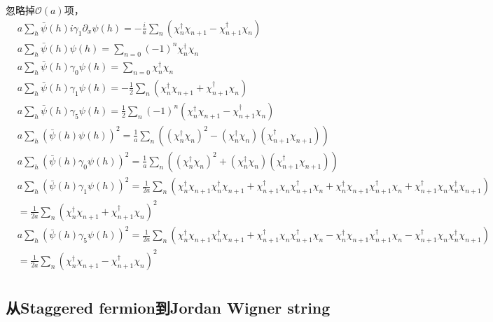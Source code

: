 忽略掉$\mathcal{O}(a)$项，
\begin{equation}
\begin{split}
&a\sum _h \bar{\psi}(h)i\gamma _1\partial _x \psi(h) = -\frac{i}{a} \sum _n \left(\chi^{\dagger}_n\chi _{n+1} - \chi ^{\dagger}_{n+1}\chi _n\right)\\
&a\sum _h \bar{\psi}(h) \psi(h) = \sum _{n=0} (-1)^n \chi^{\dagger} _n\chi _n\\
&a\sum _h \bar{\psi}(h) \gamma _0 \psi(h) =\sum _{n=0} \chi^{\dagger} _n\chi _n\\
&a\sum _h \bar{\psi}(h) \gamma _1 \psi(h) =-\frac{1}{2}\sum _{n}\left(\chi ^{\dagger}_{n}\chi _{n+1}+ \chi ^{\dagger}_{n+1}\chi _{n}\right)\\
&a\sum _h \bar{\psi}(h) \gamma _5 \psi(h) =\frac{1}{2}\sum _{n}(-1)^n\left(\chi ^{\dagger}_{n}\chi _{n+1}- \chi ^{\dagger}_{n+1}\chi _{n}\right)\\
&a\sum _h (\bar{\psi}(h) \psi(h) )^2=\frac{1}{a}\sum _n \left((\chi ^{\dagger}_{n}\chi _{n})^2-(\chi ^{\dagger}_{n}\chi _{n}) (\chi ^{\dagger}_{n+1}\chi _{n+1})\right)\\
&a\sum _h (\bar{\psi}(h) \gamma _0 \psi(h) )^2=\frac{1}{a}\sum _n \left((\chi ^{\dagger}_{n}\chi _{n})^2+(\chi ^{\dagger}_{n}\chi _{n}) (\chi ^{\dagger}_{n+1}\chi _{n+1})\right)\\
&a\sum _h (\bar{\psi}(h) \gamma _1 \psi(h) )^2=\frac{1}{2a}\sum _n \left(\chi^{\dagger}_{n}\chi_{n+1}\chi^{\dagger}_{n}\chi _{n+1}+\chi^{\dagger}_{n+1}\chi_{n}\chi^{\dagger}_{n+1}\chi _{n}+\chi^{\dagger}_{n}\chi_{n+1}\chi^{\dagger}_{n+1}\chi _{n}+\chi^{\dagger}_{n+1}\chi_{n}\chi^{\dagger}_{n}\chi _{n+1}\right)\\
&=\frac{1}{2a}\sum _n \left(\chi^{\dagger}_{n}\chi_{n+1}+\chi^{\dagger}_{n+1}\chi_{n}\right)^2\\
&a\sum _h (\bar{\psi}(h) \gamma _5 \psi(h) )^2=\frac{1}{2a}\sum _n \left(\chi^{\dagger}_{n}\chi_{n+1}\chi^{\dagger}_{n}\chi _{n+1}+\chi^{\dagger}_{n+1}\chi_{n}\chi^{\dagger}_{n+1}\chi _{n}-\chi^{\dagger}_{n}\chi_{n+1}\chi^{\dagger}_{n+1}\chi _{n}-\chi^{\dagger}_{n+1}\chi_{n}\chi^{\dagger}_{n}\chi _{n+1}\right)\\
&=\frac{1}{2a}\sum _n \left(\chi^{\dagger}_{n}\chi_{n+1}-\chi^{\dagger}_{n+1}\chi_{n}\right)^2\\
\end{split}
\end{equation}

\subsection{从Staggered fermion到Jordan Wigner string}

